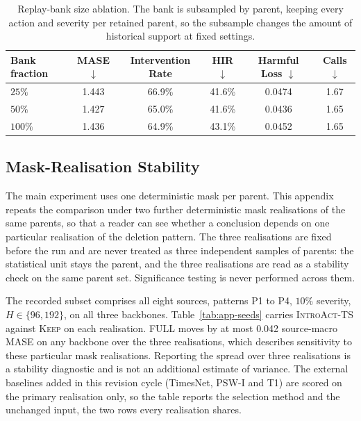 \documentclass{article}
\newcommand{\introact}{\textsc{IntroAct-TS}}
\begin{document}
\begin{table}[htbp]
  \caption{Replay-bank size ablation. The bank is subsampled by parent, keeping
  every action and severity per retained parent, so the subsample changes the amount of
  historical support at fixed settings.}
  \label{tab:app-replaysize}
  \centering
  \small
  \setlength{\tabcolsep}{4pt}
  \begin{tabular}{lccccc}
    \toprule
    Bank fraction & MASE $\downarrow$ & Intervention Rate & HIR $\downarrow$ & Harmful Loss $\downarrow$ & Calls $\downarrow$ \\
    \midrule
    $25\%$  & 1.443  & 66.9\%  & 41.6\%  & 0.0474  & 1.67 \\
    $50\%$  & 1.427  & 65.0\%  & 41.6\%  & 0.0436  & 1.65 \\
    $100\%$ & 1.436 & 64.9\% & 43.1\% & 0.0452 & 1.65 \\
    \bottomrule
  \end{tabular}
\end{table}

\subsection{Mask-Realisation Stability}
\label{app:seeds}
The main experiment uses one deterministic mask per parent. This appendix repeats the
comparison under two further deterministic mask realisations of the same parents, so that a
reader can see whether a conclusion depends on one particular realisation of the deletion
pattern. The three realisations are fixed before the run and are never treated as three
independent samples of parents: the statistical unit stays the parent, and the three
realisations are read as a stability check on the same parent set. Significance testing is
never performed across them.

The recorded subset comprises all eight sources, patterns P1 to P4, $10\%$ severity,
$H \in \{96,192\}$, on all three backbones. Table~\ref{tab:app-seeds} carries \introact{}
against \textsc{Keep} on each realisation. FULL moves by at most 0.042 source-macro MASE on
any backbone over the three realisations, which describes sensitivity to these particular
mask realisations. Reporting the spread over three
realisations is a stability diagnostic and is not an additional estimate of variance. The
external baselines added in this revision cycle (TimesNet, PSW-I and T1) are scored on the
primary realisation only, so the table reports the selection method and the unchanged
input, the two rows every realisation shares.
\end{document}
